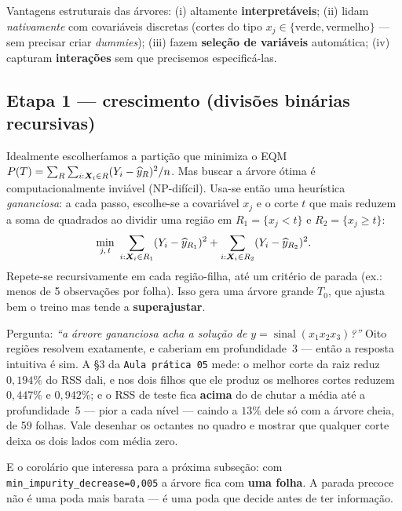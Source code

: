 \documentclass[11pt,a4paper]{article}
\begin{document}
\begin{ideia}
Vantagens estruturais das árvores: (i) altamente \textbf{interpretáveis};
(ii) lidam \emph{nativamente} com covariáveis discretas (cortes do tipo
$x_j\in\{\text{verde},\text{vermelho}\}$ --- sem precisar criar \emph{dummies});
(iii) fazem \textbf{seleção de variáveis} automática; (iv) capturam
\textbf{interações} sem que precisemos especificá-las.
\end{ideia}

\subsection{Etapa 1 --- crescimento (divisões binárias recursivas)}
Idealmente escolheríamos a partição que minimiza o EQM
$P(T)=\sum_R\sum_{i:\bm{X}_i\in R}(Y_i-\widehat y_R)^2/n$. Mas buscar a árvore ótima é
computacionalmente inviável (NP-difícil). Usa-se então uma heurística
\emph{gananciosa}: a cada passo, escolhe-se a covariável $x_j$ e o corte $t$ que
mais reduzem a soma de quadrados ao dividir uma região em
$R_1=\{x_j<t\}$ e $R_2=\{x_j\ge t\}$:
\begin{equation}\label{eq:split}
  \min_{j,\,t}\ \sum_{i:\bm{X}_i\in R_1}(Y_i-\widehat y_{R_1})^2
            + \sum_{i:\bm{X}_i\in R_2}(Y_i-\widehat y_{R_2})^2 .
\end{equation}
Repete-se recursivamente em cada região-filha, até um critério de parada (ex.: menos
de 5 observações por folha). Isso gera uma árvore grande $T_0$, que ajusta bem o
treino mas tende a \textbf{superajustar}.

\begin{emsala}
Pergunta: \emph{``a árvore gananciosa acha a solução de
$y=\operatorname{sinal}(x_1x_2x_3)$?''} Oito regiões resolvem exatamente, e caberiam
em profundidade~3 --- então a resposta intuitiva é sim. A §3 da \texttt{Aula prática
05} mede: o melhor corte da raiz reduz $0{,}194\%$ do RSS dali, e nos dois filhos que
ele produz os melhores cortes reduzem $0{,}447\%$ e $0{,}942\%$; e o RSS
de teste fica \textbf{acima} do de chutar a média até a profundidade~5 --- pior a cada
nível --- caindo a $13\%$ dele só com a árvore cheia, de 59 folhas. Vale desenhar os
octantes no quadro e mostrar que qualquer corte deixa os dois lados com média zero.

E o corolário que interessa para a próxima subseção: com
\texttt{min\_impurity\_decrease=0,005} a árvore fica com \textbf{uma folha}. A parada
precoce não é uma poda mais barata --- é uma poda que decide antes de ter informação.
\end{emsala}
\end{document}
